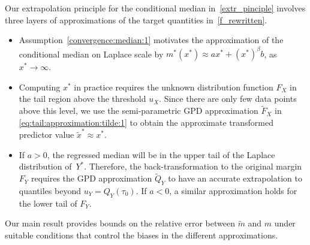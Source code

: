 \documentclass{statsoc}
\theoremstyle{break}
\newcommand{\tauzero}{\tau_0}
\begin{document}
Our extrapolation principle for the conditional median in~\eqref{extr_pinciple} involves three layers of approximations of the target quantities in~\eqref{f_rewritten}. 

\begin{itemize}
	\item[(i)] Assumption~\eqref{convergence:median:1} motivates the approximation of the conditional median on Laplace scale by $m^*(x^*) \approx  a x^* + (x^*)^\beta b$, as $x^* \to \infty$. 
	\item[(ii)] Computing $x^*$ in practice requires the unknown distribution function $F_X$ in the tail region above the threshold $u_X$. Since there are only few data points above this level, we use the semi-parametric GPD approximation $\tilde F_X$ in \eqref{eq:tail:approximation:tilde:1} to obtain the approximate transformed predictor value $ \tilde x^* \approx  x^*$.
 	\item[(iii)] If $a > 0$, the regressed median will be in the upper tail of the Laplace distribution of~$Y^*$. Therefore, the back-transformation to the original margin $F_Y$ requires the GPD approximation $\tilde Q_Y$ to have an accurate extrapolation to quantiles beyond $u_Y = Q_Y(\tauzero)$. If $a < 0$, a similar approximation holds for the lower tail of $F_Y$.
\end{itemize}

Our main result provides bounds on the relative error between $\tilde m$ and $m$ under suitable conditions that control the biases in the different approximations. 
\end{document}
